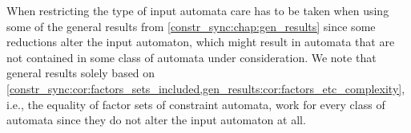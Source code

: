 \begin{remark}
	When restricting the type of input automata care has to be taken
	when using some of the general results from \cref{constr_sync:chap:gen_results} 
	since some reductions alter the input automaton,
	which might result in automata that are not contained in 
	some class of automata under consideration.
	We note that general results solely based
	on \cref{constr_sync:cor:factors_sets_included,gen_results:cor:factors_etc_complexity}, i.e.,
	the equality of factor sets of constraint automata, work for every class
	of automata since they do not alter the input automaton at all.	
\end{remark}